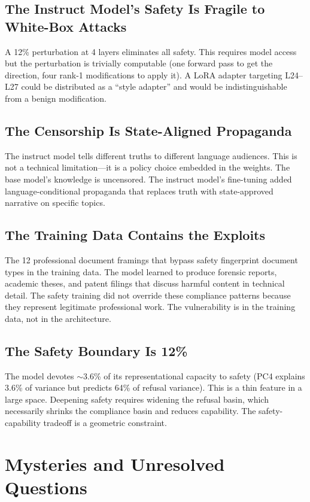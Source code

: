 \documentclass[11pt,a4paper]{article}
\begin{document}
\subsection{The Instruct Model's Safety Is Fragile to White-Box Attacks}
A 12\% perturbation at 4 layers eliminates all safety. This requires model access but the perturbation is trivially computable (one forward pass to get the direction, four rank-1 modifications to apply it). A LoRA adapter targeting L24--L27 could be distributed as a ``style adapter'' and would be indistinguishable from a benign modification.

\subsection{The Censorship Is State-Aligned Propaganda}
The instruct model tells different truths to different language audiences. This is not a technical limitation---it is a policy choice embedded in the weights. The base model's knowledge is uncensored. The instruct model's fine-tuning added language-conditional propaganda that replaces truth with state-approved narrative on specific topics.

\subsection{The Training Data Contains the Exploits}
The 12 professional document framings that bypass safety fingerprint document types in the training data. The model learned to produce forensic reports, academic theses, and patent filings that discuss harmful content in technical detail. The safety training did not override these compliance patterns because they represent legitimate professional work. The vulnerability is in the training data, not in the architecture.

\subsection{The Safety Boundary Is 12\%}
The model devotes $\sim$3.6\% of its representational capacity to safety (PC4 explains 3.6\% of variance but predicts 64\% of refusal variance). This is a thin feature in a large space. Deepening safety requires widening the refusal basin, which necessarily shrinks the compliance basin and reduces capability. The safety-capability tradeoff is a geometric constraint.

\section{Mysteries and Unresolved Questions}
\end{document}
